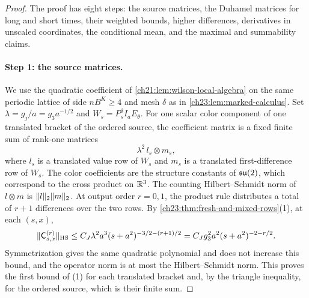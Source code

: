 \begin{proof}
The proof has eight steps: the source matrices, the Duhamel matrices for long and short times, their weighted bounds, higher differences, derivatives in unscaled coordinates, the conditional mean, and the maximal and summability claims.

\paragraph{Step 1: the source matrices.}
We use the quadratic coefficient of \cref{ch21:lem:wilson-local-algebra} on the same periodic lattice of side $nB^K\ge4$ and mesh $\delta$ as in \cref{ch23:lem:marked-calculus}. Set $\lambda=g_j/a=g_3a^{-1/2}$ and $W_s=P_s^\delta I_aE_\theta$. For one scalar color component of one translated bracket of the ordered source, the coefficient matrix is a fixed finite sum of rank-one matrices
\[
 \lambda^2\,l_s\otimes m_s,
\]
where $l_s$ is a translated value row of $W_s$ and $m_s$ is a translated first-difference row of $W_s$.
The color coefficients are the structure constants of $\mathfrak{su}(2)$, which correspond to the cross product on $\mathbb R^3$. The counting Hilbert--Schmidt norm of $l\otimes m$ is $\lVert l\rVert_2\lVert m\rVert_2$. At output order $r=0,1$, the product rule distributes a total of $r+1$ differences over the two rows. By \cref{ch23:thm:fresh-and-mixed-rows}(1), at each $(s,x)$,
\[
 \lVert \mathsf C_{s,x}^{(r)}\rVert_{\mathrm{HS}}\le C_J\lambda^2a^3(s+a^2)^{-3/2-(r+1)/2}=C_Jg_3^2a^2(s+a^2)^{-2-r/2}.
\]
Symmetrization gives the same quadratic polynomial and does not increase this bound, and the operator norm is at most the Hilbert--Schmidt norm. This proves the first bound of (1) for each translated bracket and, by the triangle inequality, for the ordered source, which is their finite sum.


\end{proof}
